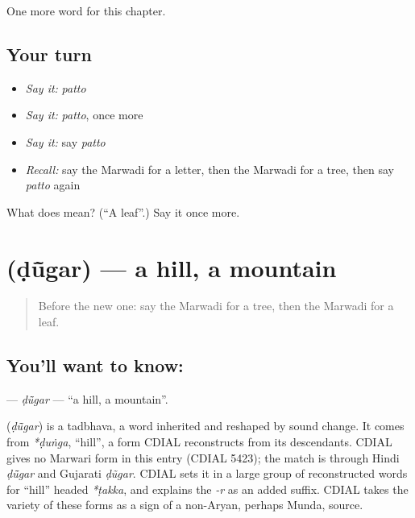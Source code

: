 \begin{grammarlens}[title={What you've built}]
One more word for this chapter.
\end{grammarlens}

\subsection*{Your turn}
\begin{itemize}
\raggedright
  \item \emph{Say it:} \emph{patto}
  \item \emph{Say it:} \emph{patto}, once more
  \item \emph{Say it:} say \emph{patto}
  \item \emph{Recall:} say the Marwadi for a letter, then the Marwadi for a tree, then say \emph{patto} again
\end{itemize}

\begin{tcolorbox}[breakable,colback=teal!4,colframe=teal!35!black,title={Before you move on}]
What does  mean? (\textquotedblleft{}A leaf\textquotedblright{}.) Say it once more.
\end{tcolorbox}
\section[\texorpdfstring{\mw{डूंगर} (ḍū̃gar)}{डूंगर (ḍū̃gar)}]{ (ḍū̃gar) — a hill, a mountain}

\label{lesson:MW-C67-dugar}



\begin{quote}
Before the new one: say the Marwadi for a tree, then the Marwadi for a leaf.
\end{quote}

\subsection*{You'll want to know: }
\textbf{} — \emph{ḍū̃gar} — \textquotedblleft{}a hill, a mountain\textquotedblright{}.

\begin{cousinweb}
\textbf{} (\emph{ḍū̃gar}) is a tadbhava, a word inherited and reshaped by sound change. It comes from \emph{*ḍuṅga}, \textquotedblleft{}hill\textquotedblright{}, a form CDIAL reconstructs from its descendants. CDIAL gives no Marwari form in this entry (CDIAL 5423); the match is through Hindi \emph{ḍū̃gar} and Gujarati \emph{ḍũgar}. CDIAL sets it in a large group of reconstructed words for \textquotedblleft{}hill\textquotedblright{} headed \emph{*ṭakka}, and explains the \emph{-r} as an added suffix. CDIAL takes the variety of these forms as a sign of a non-Aryan, perhaps Munda, source.
\end{cousinweb}

